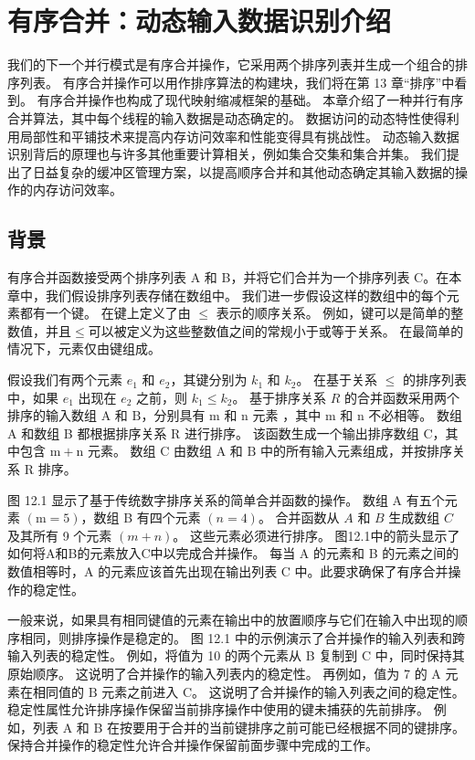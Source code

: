 \section{有序合并：动态输入数据识别介绍}
我们的下一个并行模式是有序合并操作，它采用两个排序列表并生成一个组合的排序列表。 有序合并操作可以用作排序算法的构建块，我们将在第 13 章“排序”中看到。 有序合并操作也构成了现代映射缩减框架的基础。 本章介绍了一种并行有序合并算法，其中每个线程的输入数据是动态确定的。 数据访问的动态特性使得利用局部性和平铺技术来提高内存访问效率和性能变得具有挑战性。 动态输入数据识别背后的原理也与许多其他重要计算相关，例如集合交集和集合并集。 我们提出了日益复杂的缓冲区管理方案，以提高顺序合并和其他动态确定其输入数据的操作的内存访问效率。

\subsection{背景}
有序合并函数接受两个排序列表 A 和 B，并将它们合并为一个排序列表 C。在本章中，我们假设排序列表存储在数组中。 我们进一步假设这样的数组中的每个元素都有一个键。 在键上定义了由 $\leq$ 表示的顺序关系。 例如，键可以是简单的整数值，并且$\leq$可以被定义为这些整数值之间的常规小于或等于关系。 在最简单的情况下，元素仅由键组成。

假设我们有两个元素 $e_{1}$ 和 $e_{2}$，其键分别为 $k_{1}$ 和 $k_{2}$。 在基于关系 $\leq$ 的排序列表中，如果 $e_{1}$ 出现在 $e_{2}$ 之前，则 $k_{1} \leq k_{2}$。 基于排序关系 $R$ 的合并函数采用两个排序的输入数组 $\mathrm{A}$ 和 $\mathrm{B}$，分别具有 $\mathrm{m}$ 和 $\mathrm{n}$ 元素 ，其中 $\mathrm{m}$ 和 $\mathrm{n}$ 不必相等。 数组 A 和数组 B 都根据排序关系 $\mathrm{R}$ 进行排序。 该函数生成一个输出排序数组 $\mathrm{C}$，其中包含 $\mathrm{m}+\mathrm{n}$ 元素。 数组 $\mathrm{C}$ 由数组 $\mathrm{A}$ 和 $\mathrm{B}$ 中的所有输入元素组成，并按排序关系 $\mathrm{R}$ 排序。

图 12.1 显示了基于传统数字排序关系的简单合并函数的操作。 数组 A 有五个元素 $(\mathrm{m}=5)$，数组 B 有四个元素 $(n=4)$。 合并函数从 $A$ 和 $B$ 生成数组 $C$ 及其所有 9 个元素 $(m+n)$。 这些元素必须进行排序。 图12.1中的箭头显示了如何将A和B的元素放入$\mathrm{C}$中以完成合并操作。 每当 $\mathrm{A}$ 的元素和 B 的元素之间的数值相等时，A 的元素应该首先出现在输出列表 C 中。此要求确保了有序合并操作的稳定性。

一般来说，如果具有相同键值的元素在输出中的放置顺序与它们在输入中出现的顺序相同，则排序操作是稳定的。 图 12.1 中的示例演示了合并操作的输入列表和跨输入列表的稳定性。 例如，将值为 10 的两个元素从 B 复制到 $\mathrm{C}$ 中，同时保持其原始顺序。 这说明了合并操作的输入列表内的稳定性。 再例如，值为 7 的 A 元素在相同值的 $\mathrm{B}$ 元素之前进入 $\mathrm{C}$。 这说明了合并操作的输入列表之间的稳定性。 稳定性属性允许排序操作保留当前排序操作中使用的键未捕获的先前排序。 例如，列表 A 和 B 在按要用于合并的当前键排序之前可能已经根据不同的键排序。 保持合并操作的稳定性允许合并操作保留前面步骤中完成的工作。

